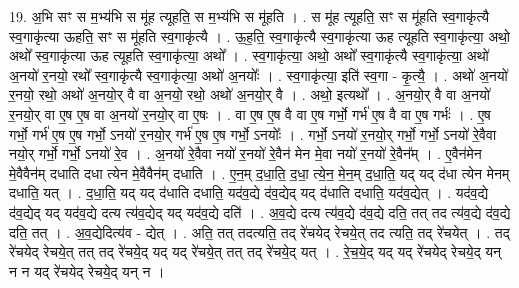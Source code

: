 \documentclass[17pt]{extarticle}
\begin{document}
19. अ॒भि सꣳ स म॒भ्य॑भि स मू॑ह त्यूहति॒ स म॒भ्य॑भि स मू॑हति । . स मू॑ह त्यूहति॒ सꣳ स मू॑हति स्व॒गाकृ॑त्यै स्व॒गाकृ॑त्या ऊहति॒ सꣳ स मू॑हति स्व॒गाकृ॑त्यै । . ऊ॒ह॒ति॒ स्व॒गाकृ॑त्यै स्व॒गाकृ॑त्या ऊह त्यूहति स्व॒गाकृ॑त्या॒ अथो॒ अथो᳚ स्व॒गाकृ॑त्या ऊह त्यूहति स्व॒गाकृ॑त्या॒ अथो᳚ । . स्व॒गाकृ॑त्या॒ अथो॒ अथो᳚ स्व॒गाकृ॑त्यै स्व॒गाकृ॑त्या॒ अथो॑ अ॒नयो॑ र॒नयो॒ रथो᳚ स्व॒गाकृ॑त्यै स्व॒गाकृ॑त्या॒ अथो॑ अ॒नयोः᳚ । . स्व॒गाकृ॑त्या॒ इति॑ स्व॒गा - कृ॒त्यै॒ । . अथो॑ अ॒नयो॑ र॒नयो॒ रथो॒ अथो॑ अ॒नयो॒र् वै वा अ॒नयो॒ रथो॒ अथो॑ अ॒नयो॒र् वै । . अथो॒ इत्यथो᳚ । . अ॒नयो॒र् वै वा अ॒नयो॑ र॒नयो॒र् वा ए॒ष ए॒ष वा अ॒नयो॑ र॒नयो॒र् वा ए॒षः । . वा ए॒ष ए॒ष वै वा ए॒ष गर्भो॒ गर्भ॑ ए॒ष वै वा ए॒ष गर्भः॑ । . ए॒ष गर्भो॒ गर्भ॑ ए॒ष ए॒ष गर्भो॒ ऽनयो॑ र॒नयो॒र् गर्भ॑ ए॒ष ए॒ष गर्भो॒ ऽनयोः᳚ । . गर्भो॒ ऽनयो॑ र॒नयो॒र् गर्भो॒ गर्भो॒ ऽनयो॑ रे॒वैवा नयो॒र् गर्भो॒ गर्भो॒ ऽनयो॑ रे॒व । . अ॒नयो॑ रे॒वैवा नयो॑ र॒नयो॑ रे॒वैन॑ मेन मे॒वा नयो॑ र॒नयो॑ रे॒वैन᳚म् । . ए॒वैन॑मेन मे॒वैवैन॑म् दधाति दधा त्येन मे॒वैवैन॑म् दधाति । . ए॒न॒म् द॒धा॒ति॒ द॒धा॒ त्ये॒न॒ मे॒न॒म् द॒धा॒ति॒ यद् यद् द॑धा त्येन मेनम् दधाति॒ यत् । . द॒धा॒ति॒ यद् यद् द॑धाति दधाति॒ यद॑व॒द्ये द॑व॒द्येद् यद् द॑धाति दधाति॒ यद॑व॒द्येत् । . यद॑व॒द्ये द॑व॒द्येद् यद् यद॑व॒द्ये दत्य त्य॑व॒द्येद् यद् यद॑व॒द्ये दति॑ । . अ॒व॒द्ये दत्य त्य॑व॒द्ये द॑व॒द्ये दति॒ तत् तद त्य॑व॒द्ये द॑व॒द्ये दति॒ तत् । . अ॒व॒द्येदित्य॑व - द्येत् । . अति॒ तत् तदत्यति॒ तद् रे॑चयेद् रेचये॒त् तद त्यति॒ तद् रे॑चयेत् । . तद् रे॑चयेद् रेचये॒त् तत् तद् रे॑चये॒द् यद् यद् रे॑चये॒त् तत् तद् रे॑चये॒द् यत् । . रे॒च॒ये॒द् यद् यद् रे॑चयेद् रेचये॒द् यन् न न यद् रे॑चयेद् रेचये॒द् यन् न । \newline
\end{document}
